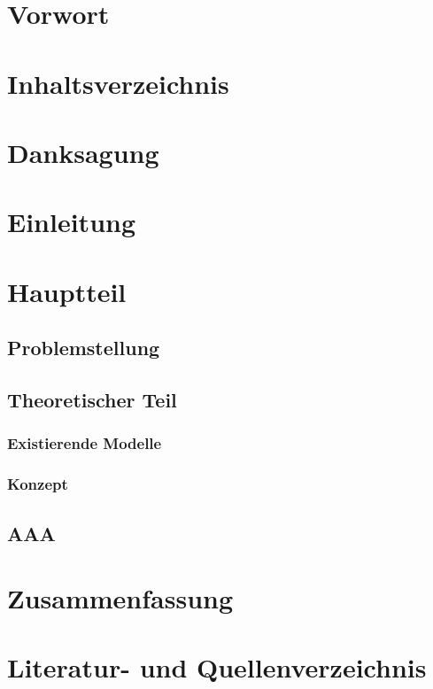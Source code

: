 \documentclass[a4paper]{article}
\begin{document}
\section{Vorwort}

\section{Inhaltsverzeichnis}
\tableofcontents

\section{Danksagung}

\section{Einleitung}

\section{Hauptteil}

\subsection{Problemstellung}

\subsection{Theoretischer Teil}

\subsubsection{Existierende Modelle}

\subsubsection{Konzept}

\subsection{AAA}

\section{Zusammenfassung}

\section{Literatur- und Quellenverzeichnis}
\end{document}
